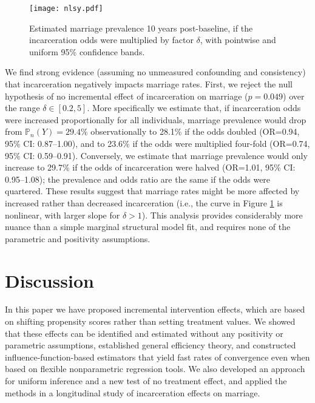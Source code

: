 \documentclass[12pt]{article}
\newcommand{\Pn}{\mathbb{P}_n}
\theoremstyle{remark}
\begin{document}
\begin{figure}[h!]
\begin{center}
\texttt{[image: nlsy.pdf]}
\caption{Estimated marriage prevalence 10 years post-baseline, if the incarceration odds were multiplied by factor $\delta$, with pointwise and uniform 95\% confidence bands.} \label{fig:app_plot}
\end{center}
\end{figure}

We find strong evidence (assuming no unmeasured confounding and consistency) that incarceration negatively impacts marriage rates. First, we reject the null hypothesis of no incremental effect of incarceration on marriage ($p =0.049$) over the range $\delta \in [0.2,5]$. More specifically we estimate that, if incarceration odds were increased proportionally for all individuals, marriage prevalence would drop from $\Pn(Y)=29.4\%$ observationally to 28.1\% if the odds doubled (OR=0.94, 95\% CI: 0.87--1.00), and to 23.6\% if the odds were multiplied four-fold (OR=0.74, 95\% CI: 0.59--0.91). Conversely, we estimate that marriage prevalence would only increase to 29.7\% if the odds of incarceration were halved (OR=1.01, 95\% CI: 0.95--1.08); the prevalence and odds ratio are the same if the odds were quartered. These results suggest that marriage rates might be more affected by increased rather than decreased incarceration (i.e., the curve in Figure \ref{fig:app_plot} is nonlinear, with larger slope for $\delta>1$). This analysis provides considerably more nuance than a simple marginal structural model fit, and requires none of the parametric and positivity assumptions.

\section{Discussion}

In this paper we have proposed incremental intervention effects, which are based on shifting propensity scores rather than setting treatment values. We showed that these effects can be identified and estimated without any positivity or parametric assumptions, established general efficiency theory, and constructed influence-function-based estimators that yield fast rates of convergence even when based on flexible nonparametric regression tools. We also developed an approach for uniform inference and a new test of no treatment effect, and applied the methods in a longitudinal study of incarceration effects on marriage.  
\end{document}
